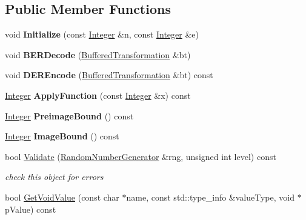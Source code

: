 \subsection*{Public Member Functions}
\begin{DoxyCompactItemize}
\item 
\hypertarget{class_l_u_c_function_a5d8eb9d2acd130a768326200e3c6ac40}{
void {\bfseries Initialize} (const \hyperlink{class_integer}{Integer} \&n, const \hyperlink{class_integer}{Integer} \&e)}
\label{class_l_u_c_function_a5d8eb9d2acd130a768326200e3c6ac40}

\item 
\hypertarget{class_l_u_c_function_a4250f047087d8c74ac2a2faf887b6155}{
void {\bfseries BERDecode} (\hyperlink{class_buffered_transformation}{BufferedTransformation} \&bt)}
\label{class_l_u_c_function_a4250f047087d8c74ac2a2faf887b6155}

\item 
\hypertarget{class_l_u_c_function_afa7df489909cf058186606b2ac515e31}{
void {\bfseries DEREncode} (\hyperlink{class_buffered_transformation}{BufferedTransformation} \&bt) const }
\label{class_l_u_c_function_afa7df489909cf058186606b2ac515e31}

\item 
\hypertarget{class_l_u_c_function_a375548f2d3cadcc98bc09559feb0c637}{
\hyperlink{class_integer}{Integer} {\bfseries ApplyFunction} (const \hyperlink{class_integer}{Integer} \&x) const }
\label{class_l_u_c_function_a375548f2d3cadcc98bc09559feb0c637}

\item 
\hypertarget{class_l_u_c_function_a7ad28477309c67d2ad11bb8ee8eff309}{
\hyperlink{class_integer}{Integer} {\bfseries PreimageBound} () const }
\label{class_l_u_c_function_a7ad28477309c67d2ad11bb8ee8eff309}

\item 
\hypertarget{class_l_u_c_function_aa1209f0c0fc371266b6aae3bd43e279c}{
\hyperlink{class_integer}{Integer} {\bfseries ImageBound} () const }
\label{class_l_u_c_function_aa1209f0c0fc371266b6aae3bd43e279c}

\item 
bool \hyperlink{class_l_u_c_function_a9bc1b75db5e2b09dd2d7cbf0e9801bf8}{Validate} (\hyperlink{class_random_number_generator}{RandomNumberGenerator} \&rng, unsigned int level) const 
\begin{DoxyCompactList}\small\item\em check this object for errors \item\end{DoxyCompactList}\item 
\hypertarget{class_l_u_c_function_abe3726e7baf96b7cc5ba488a06f29316}{
bool \hyperlink{class_l_u_c_function_abe3726e7baf96b7cc5ba488a06f29316}{GetVoidValue} (const char $\ast$name, const std::type\_\-info \&valueType, void $\ast$pValue) const }
\label{class_l_u_c_function_abe3726e7baf96b7cc5ba488a06f29316}


\end{DoxyCompactItemize}
